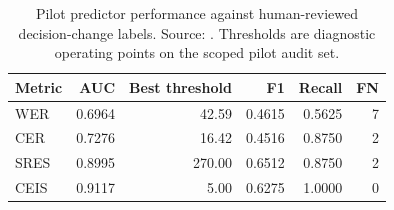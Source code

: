 \begin{table}[htbp]
\centering
\caption{Pilot predictor performance against human-reviewed decision-change labels. Source: . Thresholds are diagnostic operating points on the scoped pilot audit set.}
\label{tab:predictor}
\begin{tabular}{lrrrrr}
\toprule
Metric & AUC & Best threshold & F1 & Recall & FN \\
\midrule
WER & 0.6964 & 42.59 & 0.4615 & 0.5625 & 7 \\
CER & 0.7276 & 16.42 & 0.4516 & 0.8750 & 2 \\
SRES & 0.8995 & 270.00 & 0.6512 & 0.8750 & 2 \\
CEIS & 0.9117 & 5.00 & 0.6275 & 1.0000 & 0 \\
\bottomrule
\end{tabular}
\end{table}

